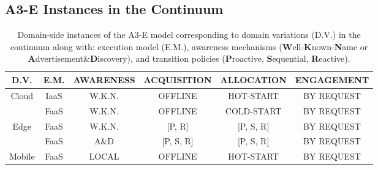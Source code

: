 



\subsection{A3-E Instances in the Continuum}

\begin{center}
	\begin{table}[htbp]
		\small
		\caption{Domain-side instances of the A3-E model corresponding to domain variations (D.V.) in the continuum along with: execution model (E.M.), awareness mechanisms (\textbf{W}ell-\textbf{K}nown-\textbf{N}ame or \textbf{A}dvertisement\&\textbf{D}iscovery), and transition policies (\textbf{P}roactive, \textbf{S}equential, \textbf{R}eactive). }\label{tab:A3-E-instances}
		\begin{tabular}{ c c c c c c }
			\toprule
			
			D.V. & E.M. & \textbf{A}WARENESS & \textbf{A}CQUISITION	& \textbf{A}LLOCATION 	& \textbf{E}NGAGEMENT  	\\
			
			\midrule
			
			\multirow{2}{*}{ Cloud }
			& IaaS	& W.K.N.	& OFFLINE		& HOT-START	& BY REQUEST\\
			& FaaS		& W.K.N.	& OFFLINE		& COLD-START	& BY REQUEST\\\midrule					
			\multirow{2}{*}{ Edge }
			& FaaS		& W.K.N.	& [P, R]		& [P, S, R] 	& BY REQUEST\\
			& FaaS		& A\&D	& [P, S, R]		& [P, S, R]		& BY REQUEST\\\midrule	
			\multirow{1}{*}{ Mobile }
			& FaaS	& LOCAL  & OFFLINE	& HOT-START 	& BY REQUEST\\
			
			\bottomrule
		\end{tabular}
	\end{table}
\end{center}
\normalsize

